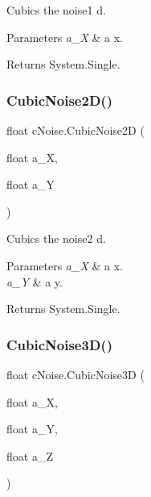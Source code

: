 Cubics the noise1 d. 


\begin{DoxyParams}{Parameters}
{\em a\+\_\+X} & a x.\\
\hline
\end{DoxyParams}
\begin{DoxyReturn}{Returns}
System.\+Single.
\end{DoxyReturn}
\mbox{\label{classc_noise_a08a8796a5bea2465cd67957313d770eb}} 
\subsubsection{\texorpdfstring{Cubic\+Noise2\+D()}{CubicNoise2D()}}
{\footnotesize\ttfamily float c\+Noise.\+Cubic\+Noise2D (\begin{DoxyParamCaption}\item[{float}]{a\+\_\+X,  }\item[{float}]{a\+\_\+Y }\end{DoxyParamCaption})\hspace{0.3cm}{\ttfamily [inline]}}



Cubics the noise2 d. 


\begin{DoxyParams}{Parameters}
{\em a\+\_\+X} & a x.\\
\hline
{\em a\+\_\+Y} & a y.\\
\hline
\end{DoxyParams}
\begin{DoxyReturn}{Returns}
System.\+Single.
\end{DoxyReturn}
\mbox{\label{classc_noise_af570557a7a32b66b8ecd9a7733d8d0bf}} 
\subsubsection{\texorpdfstring{Cubic\+Noise3\+D()}{CubicNoise3D()}}
{\footnotesize\ttfamily float c\+Noise.\+Cubic\+Noise3D (\begin{DoxyParamCaption}\item[{float}]{a\+\_\+X,  }\item[{float}]{a\+\_\+Y,  }\item[{float}]{a\+\_\+Z }\end{DoxyParamCaption})\hspace{0.3cm}{\ttfamily [inline]}}



